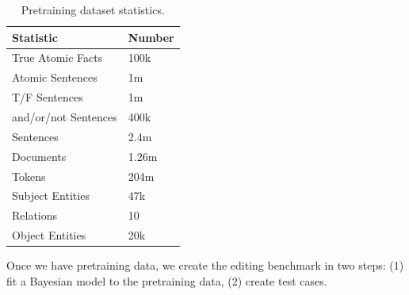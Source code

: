 \documentclass[11pt,a4paper]{article}
\begin{document}
\begin{table}[h]
  \centering
\begin{tabular}{ll}
  \hline
  Statistic & Number \\
  \hline
  True Atomic Facts & 100k \\  
  Atomic Sentences & 1m \\
  T/F Sentences & 1m \\
  and/or/not Sentences & 400k \\
  Sentences & 2.4m \\
  Documents & 1.26m \\
  Tokens & 204m \\
  Subject Entities & 47k \\
  Relations & 10 \\
  Object Entities & 20k \\
  \hline
\end{tabular}
\vspace{-3pt}
\caption{Pretraining dataset statistics.}
\label{tab:app_dataset_stats}
\end{table}

Once we have pretraining data, we create the editing benchmark in two steps: (1) fit a Bayesian model to the pretraining data, (2) create test cases.
\end{document}
